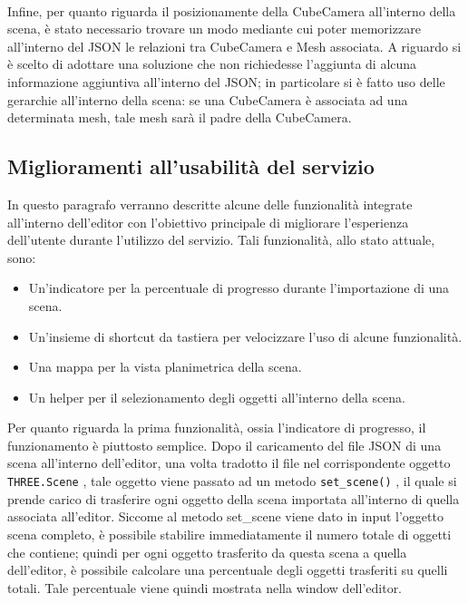 \\
Infine, per quanto riguarda il posizionamente della CubeCamera all’interno della scena, è stato necessario trovare un modo mediante cui poter memorizzare all’interno del JSON le relazioni tra CubeCamera e Mesh associata. A riguardo si è scelto di adottare una soluzione che non richiedesse l’aggiunta di alcuna informazione aggiuntiva all’interno del JSON; in particolare si è fatto uso delle gerarchie all’interno della scena: se una CubeCamera è associata ad una determinata mesh, tale mesh sarà il padre della CubeCamera. 

\subsection{Miglioramenti all’usabilità del servizio}
\label{sec:chapter_creazione_scena_funzionalita_editor_usabilita}
In questo paragrafo verranno descritte alcune delle funzionalità integrate all’interno dell’editor con l’obiettivo principale di migliorare l’esperienza dell’utente durante l’utilizzo del servizio. Tali funzionalità, allo stato attuale, sono:
\begin{itemize}
\item Un’indicatore per la percentuale di progresso durante l’importazione di una scena.
\item Un’insieme di shortcut da tastiera per velocizzare l’uso di alcune funzionalità.
\item Una mappa per la vista planimetrica della scena.
\item Un helper per il selezionamento degli oggetti all’interno della scena.
\end{itemize}
Per quanto riguarda la prima funzionalità, ossia l’indicatore di progresso, il funzionamento è piuttosto semplice. Dopo il caricamento del file JSON di una scena all’interno dell’editor, una volta tradotto il file nel corrispondente oggetto \texttt{THREE.Scene} , tale oggetto viene passato ad un metodo \texttt{set\_scene()} , il quale si prende carico di trasferire ogni oggetto della scena importata all’interno di quella associata all’editor. Siccome al metodo set\_scene viene dato in input l’oggetto scena completo, è possibile stabilire immediatamente il numero totale di oggetti che contiene; quindi per ogni oggetto trasferito da questa scena a quella dell’editor, è possibile calcolare una percentuale degli oggetti trasferiti su quelli totali. Tale percentuale viene quindi mostrata nella window dell’editor. 
\\
\\
